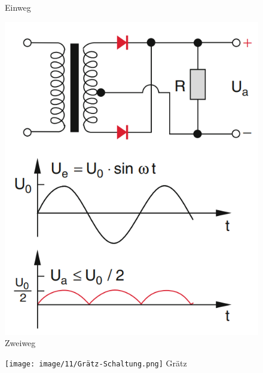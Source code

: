 \documentclass[a4paper, 11pt, ngerman, parskip=half-]{scrartcl}
\begin{document}
\begin{figure}[H]
\begin{minipage}[b]{0.3\textwidth}
        Einweg
    \end{minipage}
    \hspace{5mm}
    \begin{minipage}[b]{0.3\textwidth}
        \centering
        \includegraphics[width=\textwidth]{image/11/Zweiweg_Gleichrichter.png}
        Zweiweg
    \end{minipage}
    \hspace{5mm}
    \begin{minipage}[b]{0.3\textwidth}
        \centering
        \texttt{[image: image/11/Grätz-Schaltung.png]}
        Grätz
    \end{minipage}
\end{figure}
\end{document}
